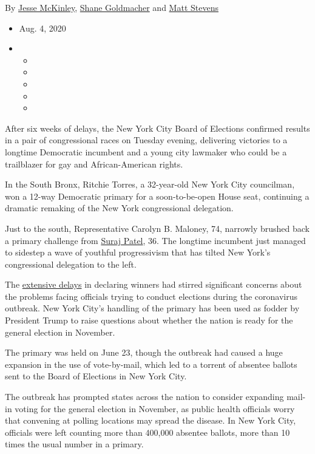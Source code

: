 By \href{https://www.nytimes.com/by/jesse-mckinley}{Jesse McKinley},
\href{https://www.nytimes.com/by/shane-goldmacher}{Shane Goldmacher} and
\href{https://www.nytimes.com/by/matt-stevens}{Matt Stevens}

\begin{itemize}
\item
  Aug. 4, 2020
\item
  \begin{itemize}
  \item
  \item
  \item
  \item
  \item
  \end{itemize}
\end{itemize}

After six weeks of delays, the New York City Board of Elections
confirmed results in a pair of congressional races on Tuesday evening,
delivering victories to a longtime Democratic incumbent and a young city
lawmaker who could be a trailblazer for gay and African-American rights.

In the South Bronx, Ritchie Torres, a 32-year-old New York City
councilman, won a 12-way Democratic primary for a soon-to-be-open House
seat, continuing a dramatic remaking of the New York congressional
delegation.

Just to the south, Representative Carolyn B. Maloney, 74, narrowly
brushed back a primary challenge from
\href{https://www.nytimes.com/2018/06/21/nyregion/congress-primaries-democrats-midterm-ny.html}{Suraj
Patel}, 36. The longtime incumbent just managed to sidestep a wave of
youthful progressivism that has tilted New York's congressional
delegation to the left.

The
\href{https://www.nytimes.com/2020/08/03/nyregion/nyc-mail-ballots-voting.html}{extensive
delays} in declaring winners had stirred significant concerns about the
problems facing officials trying to conduct elections during the
coronavirus outbreak. New York City's handling of the primary has been
used as fodder by President Trump to raise questions about whether the
nation is ready for the general election in November.

The primary was held on June 23, though the outbreak had caused a huge
expansion in the use of vote-by-mail, which led to a torrent of absentee
ballots sent to the Board of Elections in New York City.

The outbreak has prompted states across the nation to consider expanding
mail-in voting for the general election in November, as public health
officials worry that convening at polling locations may spread the
disease. In New York City, officials were left counting more than
400,000 absentee ballots, more than 10 times the usual number in a
primary.

